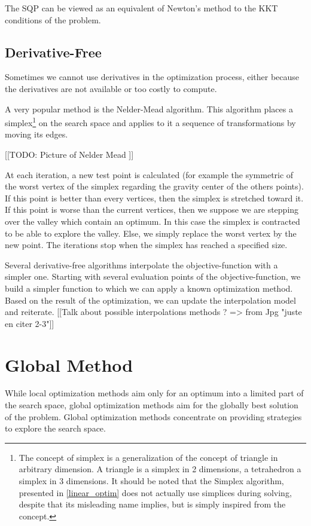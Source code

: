 The SQP can be viewed as an equivalent of Newton's method to the KKT conditions of the problem.



\subsection{Derivative-Free}

Sometimes we cannot use derivatives in the optimization process, either because the derivatives are not available or too costly to compute.

A very popular method is the Nelder-Mead algorithm. This algorithm places a simplex\footnote{The concept of simplex is a generalization of the concept of triangle in arbitrary dimension. A triangle is a simplex in 2 dimensions, a tetrahedron a simplex in 3 dimensions. It should be noted that the Simplex algorithm, presented in \ref{linear_optim} does not actually use simplices during solving, despite that its misleading name implies, but is simply inspired from the concept.} on the search space and applies to it a sequence of transformations by moving its edges.

[[TODO: Picture of Nelder Mead ]]

At each iteration, a new test point is calculated (for example the symmetric of the worst vertex of the simplex regarding the gravity center of the others points). If this point is better than every vertices, then the simplex is stretched toward it. If this point is worse than the current vertices, then we suppose we are stepping over the valley which contain an optimum. In this case the simplex is contracted to be able to explore the valley. Else, we simply replace the worst vertex by the new point.
The iterations stop when the simplex has reached a specified size.


Several derivative-free algorithms interpolate the objective-function with a simpler one. Starting with several evaluation points of the objective-function, we build a simpler function to which we can apply a known optimization method. Based on the result of the optimization, we can update the interpolation model and reiterate.
[[Talk about possible interpolations methods ? => from Jpg "juste en citer 2-3"]]

\section{Global Method}

While local optimization methods aim only for an optimum into a limited part of the search space, global optimization methods aim for the globally best solution of the problem. Global optimization methods concentrate on providing strategies to explore the search space.

